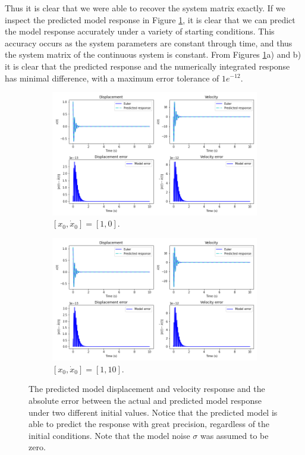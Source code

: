 \documentclass{article}
\begin{document}
Thus it is clear that we were able to recover the system matrix exactly. If we inspect the predicted model response in Figure \ref{fig:Q4a_2}, it is clear that we can predict the model response accurately under a variety of starting conditions. This accuracy occurs as the system parameters are constant through time, and thus the system matrix of the continuous system is constant. From Figures \ref{fig:Q4a_2}a) and b) it is clear that the predicted response and the numerically integrated response has minimal difference, with a maximum error tolerance of $1e^{-12}$.
\begin{figure}[!htb]
     \centering
     \begin{subfigure}[b]{0.49\textwidth}
         \centering
         \includegraphics[width=\textwidth]{Q4a_fig2.png}
         \caption{$[x_0, \dot{x}_0] = [1, 0]$.}
     \end{subfigure}
     \hfill
     \begin{subfigure}[b]{0.49\textwidth}
         \centering
         \includegraphics[width=\textwidth]{Q4a_fig2_1.png}
         \caption{$[x_0, \dot{x}_0] = [1, 10]$.}
     \end{subfigure}
        \caption{The predicted model displacement and velocity response and the absolute error between the actual and predicted model response under two different initial values. Notice that the predicted model is able to predict the response with great precision, regardless of the initial conditions. Note that the model noise $\sigma$ was assumed to be zero.}
        \label{fig:Q4a_2}
\end{figure}
\end{document}
